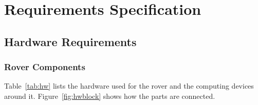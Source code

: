 \chapter{Requirements Specification}

\section{Hardware Requirements}

\subsection{Rover Components}

Table~\ref{tab:hw} lists the hardware used for the rover and the computing devices around it. Figure~\ref{fig:hwblock}
shows how the parts are connected.

